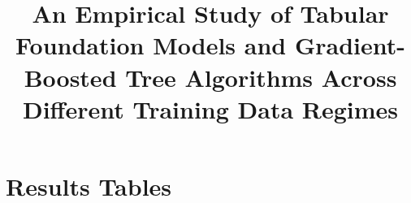 \documentclass[11pt,a4paper]{article}
\title{
    An Empirical Study of Tabular Foundation Models and
    Gradient-Boosted Tree Algorithms Across Different
    Training Data Regimes
}
\author{}
\date{}
\begin{document}
\maketitle
\thispagestyle{empty}

\clearpage




\clearpage

















\clearpage

\section*{Results Tables}

\end{document}

